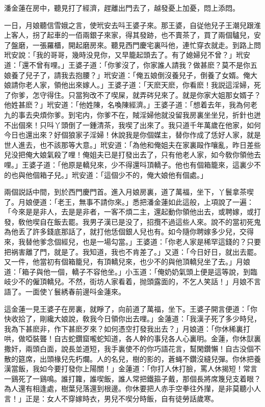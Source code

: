 潘金蓮在房中，聽見打了經濟，趕離出門去了，越發憂上加憂，悶上添悶。

一日，月娘聽信雪娥之言，使玳安去呌王婆子來。那王婆，自従他兒子王潮兒跟淮上客人，拐了起車的一佰兩銀子來家，得其發跡，也不賣茶了，買了兩個驢兒，安了盤磨，一張羅櫃，開起磨房來。聽見西門慶宅裏呌他，連忙穿衣就走。到路上問玳安說：「我的哥哥，幾時没見你，又早籠起頭去了。有了媳婦兒不曾？」玳安道：「還不曾有哩。」王婆子道：「你爹沒了，你家誰人請我？做甚麽？莫不是你五娘養了兒子了，請我去抱腰？」玳安道：「俺五娘倒沒養兒子，倒養了女婿。俺大娘請你老人家，領他出來嫁人。」王婆子道：「天麽天麽，你看麽！我説這淫婦，死了你爹，怎守得住。只當狗改不了喫屎，就弄硶兒來了。就是你家大姐那女婿子？他姓甚麽？」玳安道：「他姓陳，名喚陳經濟。」王婆子道：「想着去年，我為何老九的事去央煩你爹。到宅内，你爹不在，賊淫婦他就没留我房裏坐坐兒，折針也迸不出個來！只呌丫頭倒了一鍾清茶，我喫了出來了。我只道千年萬歲在他家，如何今日也還出來？好個狼家子淫婦！休說我是你個媒主，替你作成了恁好人家，就是世人進去，也不該那等大意。」玳安道：「為他和俺姐夫在家裏毆作嚷亂，昨日差些兒没把俺大娘氣殺了哩！俺姐夫已是打發出去了，只有他老人家，如今敎你領他去哩。」王婆子道：「他原是轎兒來，少不得還呌頂轎子。他也有個箱籠來，這裏少不的也與他個箱子兒。」玳安道：「這個少不的，俺大娘他有個處。」

兩個説話中間，到於西門慶門首。進入月娘房裏，道了萬福，坐下，丫鬟拿茶喫了。月娘便道：「老王，無事不請你來。」悉把潘金蓮如此這般，上項說了一遍：「今來是是非人，去是是非者，一客不煩二主，還起動你領他出去，或聘嫁，或打發，敎他喫自在飯去罷。我男子漢已是没了，招攬不過這些人來。說不的當初死鬼為他丢了許多錢底那話了，就打他恁個銀人兒也有。如今隨你聘嫁多少兒，交得來，我替他爹念個經兒，也是一場勾當。」王婆道：「你老人家是稀罕這錢的？只要把祸害離了門，就是了。我知道，我也不肯差了。」又道：「今日好日，就出去罷。又一件，他當初有個箱籠兒，有頂轎兒來，也少不的與他頂轎兒坐了去。」月娘道：「箱子與他一個，轎子不容他坐。」小玉道：「俺奶奶氣頭上便是這等說，到臨岐少不的僱頂轎兒。不然，街坊人家看着，抛頭露面的，不乞人笑話！」月娘不言語了。一面使丫鬟綉春前邊呌金蓮來。

這金蓮一見王婆子在房裏，就睜了，向前道了萬福，坐下。王婆子開言便道：「你快收拾了，剛纔大娘說，敎我今日領你出去哩。」金蓮道：「我漢子死了多少時兒，我為下甚麽非，作下甚麽歹來？如何憑空打發我出去？」月娘道：「你休稀裏打哄，做啞裝聾！自古蛇鑽窟嚨蛇知道，各人幹的事兒各人心裏明。金蓮，你休獃裏撒奸，兩頭白面，說長並道短，我手裏使不的你巧語花言，幫閑鑽懶！自古没個不散的筵席，出頭椽兒先朽爛。人的名兒，樹的影的，蒼蝇不鑽沒縫兒彈。你休把養漢當飯，我如今要打發你上陽關！」金蓮道：「你打人休打臉，罵人休揭短！常言一鷄死了一鷄鳴。誰打籮，誰喫飯，誰人常把鐵箍子戴，那個長將席篾兒支着眼？為人還有相逢處，樹葉兒落還到根邊。你休要把人赤手空拳往外攆，是非莫聽小人言！」正是：女人不穿嫁時衣，男兒不喫分時飯，自有徒勞話歲寒。

